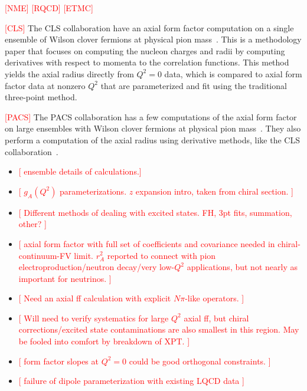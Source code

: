 \textcolor{red}{[NME]}
\textcolor{red}{[RQCD]}
\textcolor{red}{[ETMC]}

\textcolor{red}{[CLS]}
The CLS collaboration have an axial form factor computation on a
 single ensemble of Wilson clover fermions at physical pion mass~\cite{Hasan:2017wwt}.
This is a methodology paper that focuses on computing the nucleon charges
 and radii by computing derivatives with respect to momenta to the correlation functions.
This method yields the axial radius directly from $Q^2=0$ data,
 which is compared to axial form factor data at nonzero $Q^2$ that
 are parameterized and fit using the traditional three-point method.

\textcolor{red}{[PACS]}
The PACS collaboration has a few computations of the axial form factor
 on large ensembles with Wilson clover fermions at
 physical pion mass~\cite{Ishikawa:2018rew,Shintani:2018ozy}.
They also perform a computation of the axial radius using derivative methods,
 like the CLS collaboration~\cite{Ishikawa:2021eut}.

\begin{itemize}
\item
\textcolor{red}{[ ensemble details of calculations.]}
\item
\textcolor{red}{[
 $g_A(Q^2)$ parameterizations.
 $z$ expansion intro, taken from chiral section.
]}
\item
\textcolor{red}{[
 Different methods of dealing with excited states.
 FH, 3pt fits, summation, other?
]}
\item
\textcolor{red}{[
 axial form factor with full set of coefficients and covariance needed
 in chiral-continuum-FV limit.
 $r_A^2$ reported to connect with pion electroproduction/neutron decay/very low-$Q^2$ applications,
 but not nearly as important for neutrinos.
]}
\item
\textcolor{red}{[ Need an axial ff calculation with explicit $N\pi$-like operators. ]}
\item
\textcolor{red}{[ Will need to verify systematics for large $Q^2$ axial ff,
 but chiral corrections/excited state contaminations are also smallest in this region.
 May be fooled into comfort by breakdown of XPT.
]}
\item
\textcolor{red}{[ form factor slopes at $Q^2=0$ could be good orthogonal constraints.  ]}
\item
\textcolor{red}{[ failure of dipole parameterization with existing LQCD data ]}
\end{itemize}

